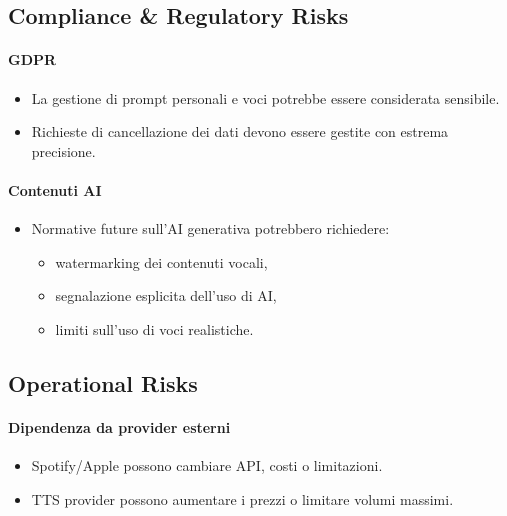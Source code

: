 \documentclass[11pt,a4paper]{article}
\begin{document}

\subsection{Compliance \& Regulatory Risks}

\paragraph{GDPR}
\begin{itemize}
    \item La gestione di prompt personali e voci potrebbe essere considerata sensibile.
    \item Richieste di cancellazione dei dati devono essere gestite con estrema precisione.
\end{itemize}

\paragraph{Contenuti AI}
\begin{itemize}
    \item Normative future sull’AI generativa potrebbero richiedere:
    \begin{itemize}
        \item watermarking dei contenuti vocali,
        \item segnalazione esplicita dell’uso di AI,
        \item limiti sull’uso di voci realistiche.
    \end{itemize}
\end{itemize}


\subsection{Operational Risks}

\paragraph{Dipendenza da provider esterni}
\begin{itemize}
    \item Spotify/Apple possono cambiare API, costi o limitazioni.
    \item TTS provider possono aumentare i prezzi o limitare volumi massimi.
\end{itemize}
\end{document}
